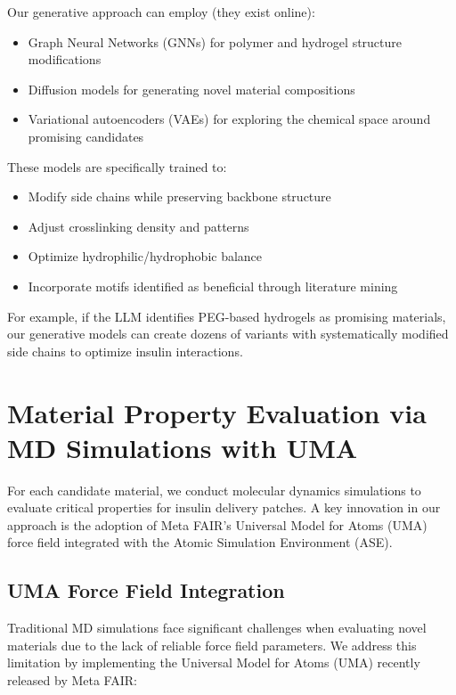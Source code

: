 \documentclass[11pt,a4paper]{article}
\begin{document}
Our generative approach can employ (they exist online):

\begin{itemize}
    \item Graph Neural Networks (GNNs) for polymer and hydrogel structure modifications
    \item Diffusion models for generating novel material compositions
    \item Variational autoencoders (VAEs) for exploring the chemical space around promising candidates
\end{itemize}

These models are specifically trained to:

\begin{itemize}
    \item Modify side chains while preserving backbone structure
    \item Adjust crosslinking density and patterns
    \item Optimize hydrophilic/hydrophobic balance
    \item Incorporate motifs identified as beneficial through literature mining
\end{itemize}

For example, if the LLM identifies PEG-based hydrogels as promising materials, our generative models can create dozens of variants with systematically modified side chains to optimize insulin interactions.

\section{Material Property Evaluation via MD Simulations with UMA}

For each candidate material, we conduct molecular dynamics simulations to evaluate critical properties for insulin delivery patches. A key innovation in our approach is the adoption of Meta FAIR's Universal Model for Atoms (UMA) force field integrated with the Atomic Simulation Environment (ASE).

\subsection{UMA Force Field Integration}

Traditional MD simulations face significant challenges when evaluating novel materials due to the lack of reliable force field parameters. We address this limitation by implementing the Universal Model for Atoms (UMA) recently released by Meta FAIR:
\end{document}
